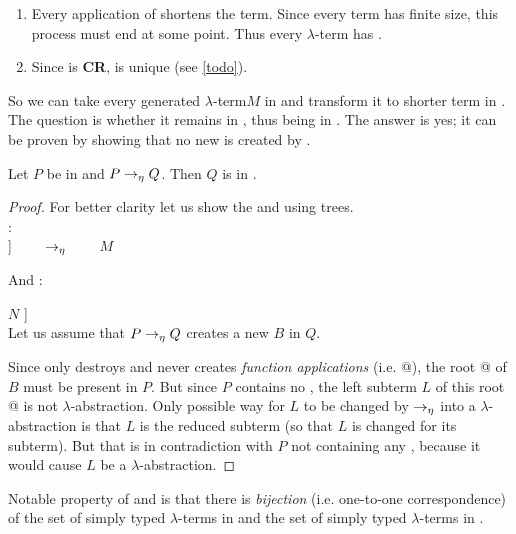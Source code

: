 \documentclass[12pt,a4paper]{report}
\newcommand{\Lets}{Let us\xspace}
\newcommand{\lets}{let us\xspace}
\newcommand{\lterm}{$\lambda$-term\xspace}
\newcommand{\lterms}{$\lambda$-terms\xspace}
\newcommand{\lh}[1]{\lambda #1}
\begin{document}
\begin{enumerate}
 \item Every application of \ered shortens the term.
       Since every term has finite size, this process must 
       end at some point. Thus every \lterm has \enf.
 \item Since \ered is \textbf{CR}, \enf is unique (see \ref{todo}). 
\end{enumerate}

So we can take every generated \lterm $M$ in 
\lnf and transform it to shorter term in \enf. 
The question is whether it remains in \bnf, thus being in \benf.
The answer is yes; it can be proven by showing that no 
new \bredex is created by \ered.  

\begin{proposition}
Let $P$ be in \bnf and $P \rightarrow_\eta Q$. Then $Q$ is in \bnf.    
\end{proposition}
\begin{proof}

For better clarity \lets show the \ered and \bredex using trees.\\
\ered: \\

\Tree [.$\lh{x}$ [.@ $M$ $x$ ] ] 
~~~~$\rightarrow_\eta$~~~~
$M$ 

And \bredex:

\Tree [.@ [.$\lh{x}$ $M$ ] $N$ ] \\

\Lets assume that $P \rightarrow_\eta Q$ creates a new \bredex $B$ in $Q$.

Since \ered only destroys and never creates \textit{function applications} (i.e. @),
the root @ of $B$ must be present in $P$.  
But since $P$ contains no \bredex, the left subterm $L$ of this root @
is not $\lambda$-abstraction.
Only possible way for $L$ to be changed by $\rightarrow_\eta$ into 
a $\lambda$-abstraction is that $L$ is the reduced subterm (so that
$L$ is changed for its subterm).
But that is in contradiction with $P$ not containing any \bredex,
because it would cause $L$ be a $\lambda$-abstraction.

\end{proof}

Notable property of \lnf and \benf is that there is \textit{bijection} 
(i.e. one-to-one correspondence) of 
the set of simply typed \lterms in \lnf and 
the set of simply typed \lterms in \benf.
\end{document}
